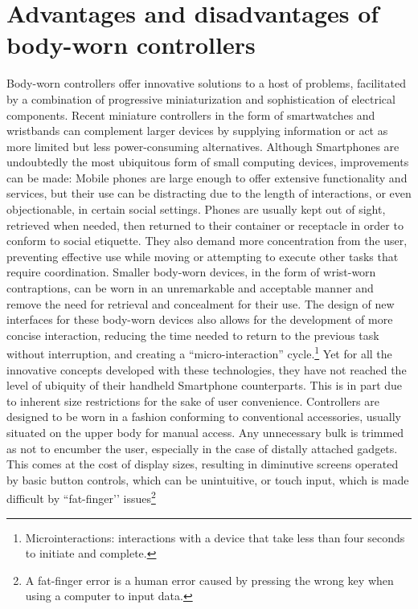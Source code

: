 \documentclass{sigchi}
\begin{document}
\section{Advantages and disadvantages of body-worn controllers}
Body-worn controllers offer innovative solutions to a host of problems, facilitated by a combination of progressive miniaturization and sophistication of electrical components. Recent miniature controllers in the form of smartwatches and wristbands can complement larger devices by supplying information or act as more limited but less power-consuming alternatives. \cite{motion-ui} Although Smartphones are undoubtedly the most ubiquitous form of small computing devices, improvements can be made: Mobile phones are large enough to offer extensive functionality and services, but their use can be distracting due to the length of interactions, or even objectionable, in certain social settings. Phones are usually kept out of sight, retrieved when needed, then returned to their container or receptacle in order to conform to social etiquette. They also demand more concentration from the user, preventing effective use while moving or attempting to execute other tasks that require coordination. Smaller body-worn devices, in the form of wrist-worn contraptions, can be worn in an unremarkable and acceptable manner and remove the need for retrieval and concealment for their use. The design of new interfaces for these body-worn devices also allows for the development of more concise interaction, reducing the time needed to return to the previous task without interruption, and creating a ``micro-interaction'' cycle.\footnote{Microinteractions: interactions with a device that take less than four seconds to initiate and complete.} \cite{microinteraction}
Yet for all the innovative concepts developed with these technologies, they have not reached the level of ubiquity of their handheld Smartphone counterparts.
This is in part due to inherent size restrictions for the sake of user convenience. Controllers are designed to be worn in a fashion conforming to conventional accessories, usually situated on the upper body for manual access. Any unnecessary bulk is trimmed as not to encumber the user, especially in the case of distally attached gadgets. This comes at the cost of display sizes, resulting in diminutive screens operated by basic button controls, which can be unintuitive, or touch input, which is made difficult by ``fat-finger’’ issues\footnote{A fat-finger error is a human error caused by pressing the wrong key when using a computer to input data.} %
\end{document}
